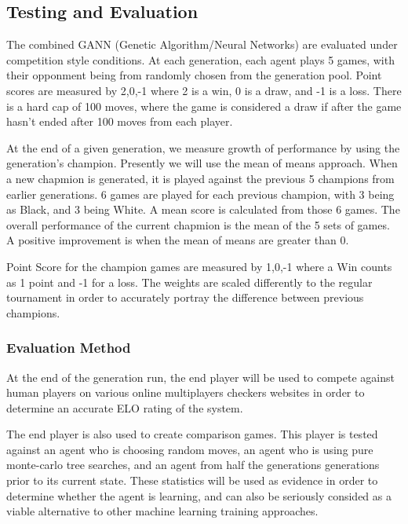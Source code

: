 \documentclass[12pt,a4paper]{article}
\begin{document}
\subsection*{Testing and Evaluation}

    The combined GANN (Genetic Algorithm/Neural Networks) are evaluated under competition style conditions. At each generation, each agent plays 5 games, with their opponment being from randomly chosen from the generation pool. Point scores are measured by {2,0,-1} where 2 is a win, 0 is a draw, and -1 is a loss. There is a hard cap of 100 moves, where the game is considered a draw if after the game hasn't ended after 100 moves from each player.

    At the end of a given generation, we measure growth of performance by using the generation's champion. Presently we will use the mean of means approach. When a new chapmion is generated, it is played against the previous 5 champions from earlier generations. 6 games are played for each previous champion, with 3 being as Black, and 3 being White. A mean score is calculated from those 6 games. The overall performance of the current chapmion is the mean of the 5 sets of games. A positive improvement is when the mean of means are greater than 0. 

    Point Score for the champion games are measured by {1,0,-1} where a Win counts as 1 point and -1 for a loss. The weights are scaled differently to the regular tournament in order to accurately portray the difference between previous champions.

    \subsubsection*{Evaluation Method}

    At the end of the generation run, the end player will be used to compete against human players on various online multiplayers checkers websites in order to determine an accurate ELO rating of the system.

    The end player is also used to create comparison games. This player is tested against an agent who is choosing random moves, an agent who is using pure monte-carlo tree searches, and an agent from half the generations generations prior to its current state. These statistics will be used as evidence in order to determine whether the agent is learning, and can also be seriously consided as a viable alternative to other machine learning training approaches.
\end{document}
